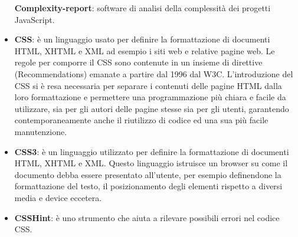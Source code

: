\begin{itemize}
	\textbf{Complexity-report}: software di analisi della complessità dei progetti JavaScript. 
	\item
	\textbf{CSS}: è un linguaggio usato per definire la formattazione di documenti HTML, XHTML e XML ad esempio i siti web e relative pagine web. Le regole per comporre il CSS sono contenute in un insieme di direttive (Recommendations) emanate a partire dal 1996 dal W3C.
	L'introduzione del CSS si è resa necessaria per separare i contenuti delle pagine HTML dalla loro formattazione e permettere una programmazione più chiara e facile da utilizzare, sia per gli autori delle pagine stesse sia per gli utenti, garantendo contemporaneamente anche il riutilizzo di codice ed una sua più facile manutenzione. 
	\item
	\textbf{CSS3}: è un linguaggio utilizzato per definire la formattazione di documenti HTML, XHTML e XML.
	Questo linguaggio istruisce un browser su come il documento debba essere presentato all'utente, per esempio definendone la formattazione del testo, il posizionamento degli elementi rispetto a diversi media e device eccetera.
	\item
	\textbf{CSSHint}: è uno strumento che aiuta a rilevare possibili errori nel codice CSS.
\end{itemize}